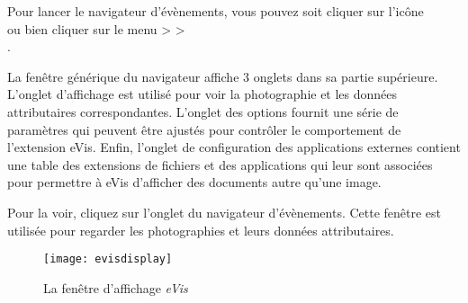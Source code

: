 Pour lancer le navigateur d'évènements, vous pouvez soit cliquer sur l'icône\\  ou bien cliquer sur le menu  >  >\\ .


La fenêtre générique du navigateur affiche 3 onglets dans sa partie supérieure. L'onglet d'affichage est utilisé pour voir la photographie et les données attributaires correspondantes. L'onglet des options fournit une série de paramètres qui peuvent être ajustés pour contrôler le comportement de l'extension eVis. Enfin, l'onglet de configuration des applications externes contient une table des extensions de fichiers et des applications qui leur sont associées pour permettre à eVis d'afficher des documents autre qu'une image.

\label{evis_display_window}

Pour la voir, cliquez sur l'onglet  du navigateur d'évènements. Cette fenêtre est utilisée pour regarder les photographies et leurs données attributaires.

\begin{figure}[ht]
   \begin{center}
\texttt{[image: evisdisplay]}
\caption{\label{evisdisplay}La fenêtre d'affichage \emph{eVis} \nixcaption}
\end{center}
\end{figure}

